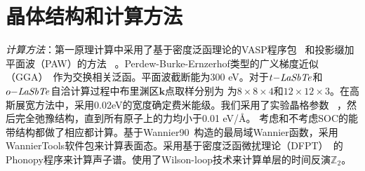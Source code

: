 \section{晶体结构和计算方法}
{\it{计算方法}}：第一原理计算中采用了基于密度泛函理论的VASP程序包~\citep{KRESSE199615,vasp} 和投影缀加平面波（PAW）的方法~\citep{paw1,paw2} 。Perdew-Burke-Ernzerhof类型的广义梯度近似（GGA）~\citep{pbe}作为交换相关泛函。平面波截断能为300 eV。对于$t\it{-LaSbTe}$和$o\it{-LaSbTe}$自洽计算过程中布里渊区$\mathbf{k}$点取样分别为
为$8\times 8 \times 4$和$12\times 12 \times 3$。在高斯展宽方法中，采用0.02eV的宽度确定费米能级。我们采用了实验晶格参数~\citep{charvillat1977cristallochimie,dimasi1996stability} ，然后完全弛豫结构，直到所有原子上的力均小于0.01 eV/\AA。
考虑和不考虑SOC的能带结构都做了相应都计算。基于Wannier90~\citep{mlwf}构造的最局域Wannier函数，采用WannierTools软件包\cite{WU2017}来计算表面态。采用基于密度泛函微扰理论（DFPT）~\citep{togo2015first}的Phonopy程序来计算声子谱。使用了Wilson-loop技术来计算单层的时间反演$\mathbb{Z}_2$。

